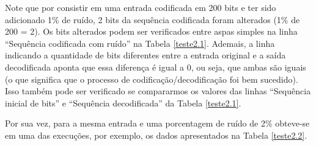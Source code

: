 \documentclass[12pt]{article}
\begin{document}
Note que por consistir em uma entrada codificada em 200 bits e ter sido adicionado 1\% de ruído, 2 bits da sequência codificada foram alterados (1\% de 200 = 2). Os bits alterados podem ser verificados entre aspas simples na linha ``Sequência codificada com ruído'' na Tabela \ref{teste2.1}. Ademais, a linha indicando a quantidade de bits diferentes entre a entrada original e a saída decodificada aponta que essa diferença é igual a 0, ou seja, que ambas são iguais (o que significa que o processo de codificação/decodificação foi bem sucedido). Isso também pode ser verificado se compararmos os valores das linhas ``Sequência inicial de bits'' e ``Sequência decodificada'' da Tabela \ref{teste2.1}.

Por sua vez, para a mesma entrada e uma porcentagem de ruído de 2\% obteve-se em uma das execuções, por exemplo, os dados apresentados na Tabela \ref{teste2.2}.
\end{document}

